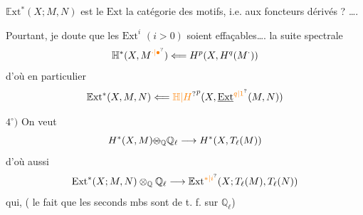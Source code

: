 $\mathbb E\mathrm{xt}^*(X;M,N)$ est le  $\mathrm{Ext}$  la catégorie des motifs, i.e. aux foncteurs dérivés ? \ldots.

Pourtant, je doute que les $\mathrm{Ext}^i$ $(i>0)$ soient effaçables\ldots.   la suite spectrale
\[
\mathbb H^*(X,M^{\unsure{\cdot|\bullet}})\Longleftarrow H^p(X,H^q(M^\cdot))
\]
d'où en particulier
\[
\mathbb E\mathrm{xt}^*(X,M,N)\Longleftarrow \unsure{\mathbb H|H}^p(X,\underline{\mathrm{Ext}}^{\unsure{q|1}}(M,N))
\]

$4^\circ)$ On veut  
\[
H^*(X,M)\deleted{\otimes}_{\mathbb Q}\mathbb Q_\ell\longrightarrow H^*(X,T_\ell(M))
\]
d'où aussi
\[
\mathrm{Ext}^*(X;M,N)\otimes_{\mathbb Q}\mathbb Q_\ell\longrightarrow\mathbb E\mathrm{xt}^{\unsure{*|i}}(X;T_\ell(M),T_\ell(N))
\]
qui,   ( le fait que les seconds mbs sont de t. f. sur $\mathbb Q_\ell$)

